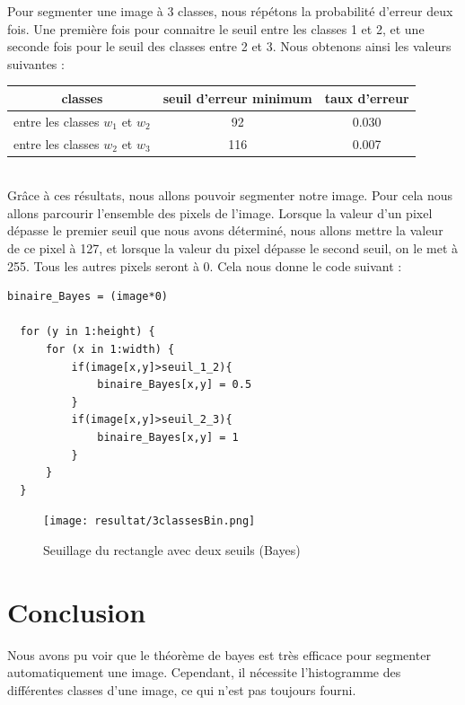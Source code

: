\documentclass[a4paper,11pt]{article}
\begin{document}
  Pour segmenter une image à 3 classes, nous répétons la probabilité d'erreur deux fois. Une première fois
  pour connaitre le seuil entre les classes 1 et 2, et une seconde fois pour le seuil des classes entre 2 et 3.
  Nous obtenons ainsi les valeurs suivantes :
  
  \begin{center}
  \begin{tabular}{|c|c|c|}
   \hline
   classes & seuil d'erreur minimum & taux d'erreur \\
   \hline
   entre les classes $w_1$ et $w_2$ & 92 & 0.030 \\
   \hline
   entre les classes $w_2$ et $w_3$ & 116 & 0.007 \\
   \hline
  \end{tabular}
  \end{center}
  \ \\
  Grâce à ces résultats, nous allons pouvoir segmenter notre image. Pour cela nous allons parcourir l'ensemble 
  des pixels de l'image. Lorsque la valeur d'un pixel dépasse le premier seuil que nous avons déterminé, nous allons 
  mettre la valeur de ce pixel à 127, et lorsque la valeur du pixel dépasse le second seuil, on le met à 255. Tous 
  les autres pixels seront à 0. Cela nous donne le code suivant :\\ 
  
  \begin{lstlisting}[caption=Segmenter une image à trois classe]
  binaire_Bayes = (image*0)

  for (y in 1:height) {
      for (x in 1:width) {
          if(image[x,y]>seuil_1_2){
              binaire_Bayes[x,y] = 0.5
          }
          if(image[x,y]>seuil_2_3){
              binaire_Bayes[x,y] = 1
          }
      }
  }
  \end{lstlisting}
  
  \begin{figure}[H]
    \center
    \texttt{[image: resultat/3classesBin.png]}
    \caption{Seuillage du rectangle avec deux seuils (Bayes)}
  \end{figure}
  
%   
  
  
  \section*{Conclusion}
  Nous avons pu voir que le théorème de bayes est très efficace pour segmenter automatiquement une image. Cependant, il nécessite
  l'histogramme des différentes classes d'une image, ce qui n'est pas toujours fourni.
    
\end{document}
